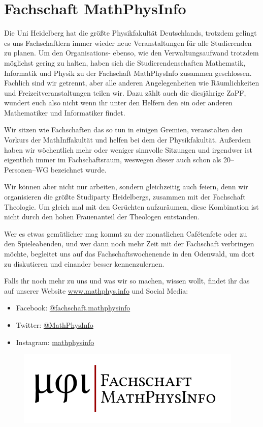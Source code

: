 
\section{Fachschaft MathPhysInfo}

Die Uni Heidelberg hat die größte Physikfakultät Deutschlands, trotzdem gelingt es uns Fachschaftlern immer wieder neue Veranstaltungen für alle Studierenden zu planen. Um den Organisations- ebenso, wie den Verwaltungsaufwand trotzdem möglichst gering zu halten, haben sich die Studierendenschaften Mathematik, Informatik und Physik zu der Fachschaft MathPhysInfo zusammen geschlossen. Fachlich sind wir getrennt, aber alle anderen Angelegenheiten wie Räumlichkeiten und Freizeitveranstaltungen teilen wir. Dazu zählt auch die diesjährige ZaPF, wundert euch also nicht wenn ihr unter den Helfern den ein oder anderen Mathematiker und Informatiker findet.

Wir sitzen wie Fachschaften das so tun in einigen Gremien, veranstalten den Vorkurs der MathInffakultät und helfen bei dem der Physikfakultät. Außerdem haben wir wöchentlich mehr oder weniger sinnvolle Sitzungen und irgendwer ist eigentlich immer im Fachschaftsraum, weswegen dieser auch schon als 20--Personen--WG bezeichnet wurde.

Wir können aber nicht nur arbeiten, sondern gleichzeitig auch feiern, denn wir organisieren die größte Studiparty Heidelbergs, zusammen mit der Fachschaft Theologie. Um gleich mal mit den Gerüchten aufzuräumen, diese Kombination ist nicht durch den hohen Frauenanteil der Theologen entstanden.

Wer es etwas gemütlicher mag kommt zu der monatlichen Cafétenfete oder zu den Spieleabenden, und wer dann noch mehr Zeit mit der Fachschaft verbringen möchte, begleitet uns auf das Fachschaftswochenende in den Odenwald, um dort zu diskutieren und einander besser kennenzulernen.

Falls ihr noch mehr zu uns und was wir so machen, wissen wollt, findet ihr das auf unserer Website \url{www.mathphys.info} und Social Media: 
\begin{itemize}
\item[\faFacebookSquare] Facebook: \href{https://www.facebook.com/fachschaft.mathphysinfo}{@fachschaft.mathphysinfo}
\item[\faTwitterSquare] Twitter: \href{https://twitter.com/MathPhysInfo}{@MathPhysInfo}
\item[\faInstagram] Instagram: \href{https://www.instagram.com/mathphysinfo/}{mathphysinfo}
\end{itemize}


\begin{figure}[h]
\centering
\includegraphics[width=.5\textwidth]{media/mathphysinfologo}
\end{figure}